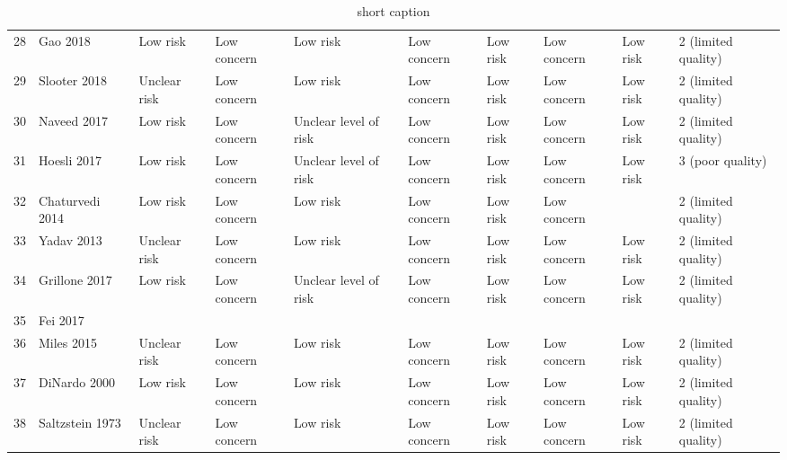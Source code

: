 \begin{table}[ht]
\begin{tabular}{rlllllllll}
  28 & Gao 2018 & Low risk & Low concern & Low risk & Low concern & Low risk & Low concern & Low risk & 2 (limited quality) \\ 
  29 & Slooter 2018 & Unclear risk & Low concern & Low risk & Low concern & Low risk & Low concern & Low risk & 2 (limited quality) \\ 
  30 & Naveed 2017 & Low risk & Low concern & Unclear level of risk & Low concern & Low risk & Low concern & Low risk & 2 (limited quality) \\ 
  31 & Hoesli 2017 & Low risk & Low concern & Unclear level of risk & Low concern & Low risk & Low concern & Low risk & 3 (poor quality) \\ 
  32 & Chaturvedi 2014 & Low risk & Low concern & Low risk & Low concern & Low risk & Low concern &  & 2 (limited quality) \\ 
  33 & Yadav 2013 & Unclear risk & Low concern & Low risk & Low concern & Low risk & Low concern & Low risk & 2 (limited quality) \\ 
  34 & Grillone 2017 & Low risk & Low concern & Unclear level of risk & Low concern & Low risk & Low concern & Low risk & 2 (limited quality) \\ 
  35 & Fei 2017 &  &  &  &  &  &  &  &  \\ 
  36 & Miles 2015 & Unclear risk & Low concern & Low risk & Low concern & Low risk & Low concern & Low risk & 2 (limited quality) \\ 
  37 & DiNardo 2000 & Low risk & Low concern & Low risk & Low concern & Low risk & Low concern & Low risk & 2 (limited quality) \\ 
  38 & Saltzstein 1973 & Unclear risk & Low concern & Low risk & Low concern & Low risk & Low concern & Low risk & 2 (limited quality) \\ 
   \hline
\end{tabular}
\endgroup
\caption[full caption]{short caption} 
\label{tab:qual_scores}
\end{table}
